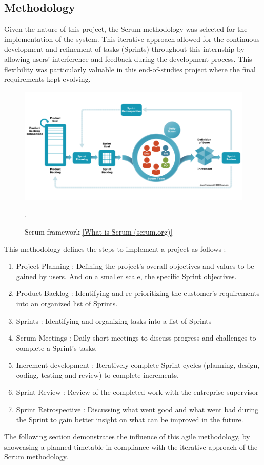 \subsection{Methodology}
Given the nature of this project, the Scrum methodology was selected for the implementation of the system. This iterative approach allowed for the continuous development and refinement of tasks (Sprints) throughout this internship by allowing users' interference and feedback during the development process. This flexibility was particularly valuable in this end-of-studies project where the final requirements kept evolving.
\begin{figure}[htbp]
    \centering
    \includegraphics[width=\linewidth]{./figures/scrum-framework-9.29.23.png}
    \caption{Scrum framework \href{https://www.scrum.org/resources/what-scrum-module}{[What is Scrum (scrum.org)]}}.
\end{figure}\newline
This methodology defines the steps to implement a project as follows :
\begin{enumerate}
    \item Project Planning : Defining the project's overall objectives and values to be gained by users. And on a smaller scale, the specific Sprint objectives.
    \item Product Backlog : Identifying and re-prioritizing the customer's requirements into an organized list of Sprints.
    \item Sprints : Identifying and organizing tasks into a list of Sprints
    \item Scrum Meetings : Daily short meetings to discuss progress and challenges to complete a Sprint's tasks.
    \item Increment development : Iteratively complete Sprint cycles (planning, design, coding, testing and review) to complete increments.
    \item Sprint Review : Review of the completed work with the entreprise supervisor
    \item Sprint Retrospective : Discussing what went good and what went bad during the Sprint to gain better insight on what can be improved in the future.
\end{enumerate}
The following section demonstrates the influence of this agile methodology, by showcasing a planned timetable in compliance with the iterative approach of the Scrum methodology.\newpage
